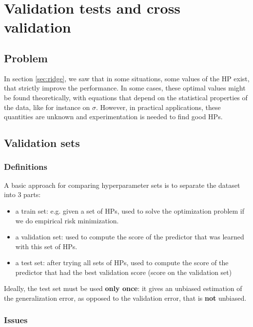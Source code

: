 \documentclass[
10pt, %
a4paper, %
oneside, %
headinclude,footinclude, %
BCOR5mm, %
]{scrartcl}
\begin{document}
\section{\large\color{Blue}Validation tests and cross validation}

\subsection{Problem}

In section \ref{sec:ridge}, we saw that in some situations, some values of the HP exist, that strictly improve the performance. In some cases, these optimal values might be found theoretically, with equations that depend on the statistical properties of the data, like for instance on $\sigma$. However, in practical applications, these quantities are unknown and experimentation is needed to find good HPs.

\subsection{Validation sets}

\subsubsection{Definitions}%
\label{ssub:Definitions}

A basic approach for comparing hyperparameter sets is to separate the dataset into $3$ parts:
\begin{itemize}
    \item a train set: e.g. given a set of HPs, used to solve the optimization problem if we do empirical risk minimization.
    \item a validation set: used to compute the score of the predictor that was learned with this set of HPs.
    \item a test set: after trying all sets of HPs, used to compute the score of the predictor that had the best validation score (score on the validation set)
\end{itemize}

Ideally, the test set must be used \textbf{only once}: it gives an unbiased estimation of the generalization error, as opposed to the validation error, that is \textbf{not} unbiased.

\subsubsection{Issues}%
\label{ssub:Issues}
\end{document}
